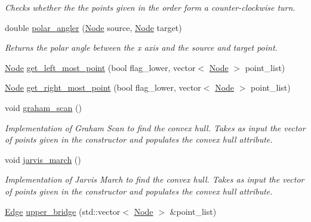 \begin{DoxyCompactItemize}
\begin{DoxyCompactList}\small\item\em Checks whether the the points given in the order form a counter-\/clockwise turn. \end{DoxyCompactList}\item 
double \hyperlink{classGraph_af62998005ee35671342b379af7400b1b}{polar\+\_\+angler} (\hyperlink{classNode}{Node} source, \hyperlink{classNode}{Node} target)
\begin{DoxyCompactList}\small\item\em Returns the polar angle between the x axis and the source and target point. \end{DoxyCompactList}\item 
\hyperlink{classNode}{Node} \hyperlink{classGraph_af87a876de5bf77e8acc6c1e646c48472}{get\+\_\+left\+\_\+most\+\_\+point} (bool flag\+\_\+lower, vector$<$ \hyperlink{classNode}{Node} $>$ point\+\_\+list)
\item 
\hyperlink{classNode}{Node} \hyperlink{classGraph_ab57f27f64ee47cd5e9a49fdb6de85554}{get\+\_\+right\+\_\+most\+\_\+point} (bool flag\+\_\+lower, vector$<$ \hyperlink{classNode}{Node} $>$ point\+\_\+list)
\item 
\mbox{\label{classGraph_a606f345b4d2a90c850733272db8f0936}} 
void \hyperlink{classGraph_a606f345b4d2a90c850733272db8f0936}{graham\+\_\+scan} ()
\begin{DoxyCompactList}\small\item\em Implementation of Graham Scan to find the convex hull. Takes as input the vector of points given in the constructor and populates the convex hull attribute. \end{DoxyCompactList}\item 
\mbox{\label{classGraph_a3645385ecb98f9082c38facede7b1555}} 
void \hyperlink{classGraph_a3645385ecb98f9082c38facede7b1555}{jarvis\+\_\+march} ()
\begin{DoxyCompactList}\small\item\em Implementation of Jarvis March to find the convex hull. Takes as input the vector of points given in the constructor and populates the convex hull attribute. \end{DoxyCompactList}\item 
\hyperlink{classEdge}{Edge} \hyperlink{classGraph_a52305b31ad2a6ad8eb200b9413bed9be}{upper\+\_\+bridge} (std\+::vector$<$ \hyperlink{classNode}{Node} $>$ \&point\+\_\+list)

\end{DoxyCompactItemize}
